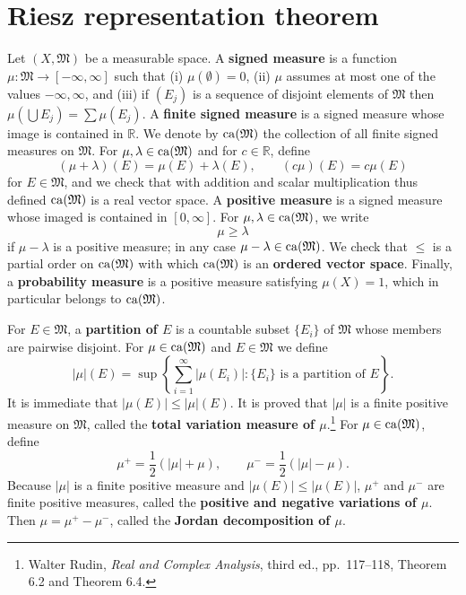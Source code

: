 \documentclass{article}
\newcommand{\ca}{\ensuremath\mathrm{ca}}
\theoremstyle{definition}
\theoremstyle{definition}
\begin{document}
\section{Riesz representation theorem}
Let $(X,\mathfrak{M})$ be a measurable space. 
A \textbf{signed measure} is a function $\mu:\mathfrak{M} \to [-\infty,\infty]$ such that
(i) $\mu(\emptyset)=0$, (ii) $\mu$ assumes at most one of the values $-\infty,\infty$, and (iii)
 if $(E_j)$ is a sequence of disjoint elements of $\mathfrak{M}$
then $\mu\left(\bigcup E_j\right) = \sum \mu(E_j)$. 
A \textbf{finite signed measure} is a signed measure whose image is contained in $\mathbb{R}$. 
We denote by 
$\ca(\mathfrak{M})$ 
the collection of all finite signed measures on $\mathfrak{M}$. 
For $\mu,\lambda \in \ca(\mathfrak{M})$ and for $c \in \mathbb{R}$, define
\[
(\mu+\lambda)(E) = \mu(E)+\lambda(E),
\qquad (c\mu)(E) = c \mu(E)
\]
for $E \in \mathfrak{M}$, and we check that with addition and scalar multiplication thus defined $\ca(\mathfrak{M})$ is a real vector space.
A \textbf{positive measure} is a 
signed measure whose imaged is contained in $[0,\infty]$. For $\mu,\lambda \in \ca(\mathfrak{M})$, we write 
\[
\mu \geq \lambda
\]
if $\mu-\lambda$ is a positive measure; in any case $\mu-\lambda \in \ca(\mathfrak{M})$. We check that $\leq$ is a partial order
on $\ca(\mathfrak{M})$ with which $\ca(\mathfrak{M})$ is an \textbf{ordered vector space}.
Finally, a \textbf{probability measure} is a positive measure satisfying $\mu(X)=1$, which in
particular belongs to $\ca(\mathfrak{M})$. 

For $E \in \mathfrak{M}$, a \textbf{partition of $E$} is a countable subset $\{E_i\}$
of $\mathfrak{M}$ whose members are pairwise disjoint. 
For $\mu \in \ca(\mathfrak{M})$ and $E \in \mathfrak{M}$ we define
\[
|\mu|(E) = \sup \left\{\sum_{i=1}^\infty |\mu(E_i)|: \textrm{$\{E_i\}$ is a partition of $E$}\right\}.
\]
It is immediate that $|\mu(E)| \leq |\mu|(E)$. 
It is proved that $|\mu|$ is a finite positive measure on $\mathfrak{M}$,
called the \textbf{total variation measure of $\mu$}.\footnote{Walter Rudin, {\em Real
and Complex Analysis}, third ed., pp.~117--118, Theorem 6.2 and Theorem 6.4.}
For $\mu \in \ca(\mathfrak{M})$, define
\[
\mu^+ = \frac{1}{2}(|\mu|+\mu),\qquad
\mu^-=\frac{1}{2}(|\mu|-\mu).
\]
Because $|\mu|$ is a finite positive measure and $|\mu(E)| \leq |\mu(E)|$, 
$\mu^+$ and $\mu^-$ are finite positive measures, called the \textbf{positive and
negative variations of $\mu$}. Then $\mu=\mu^+ -\mu^-$, called the \textbf{Jordan
decomposition of $\mu$}. 
\end{document}
